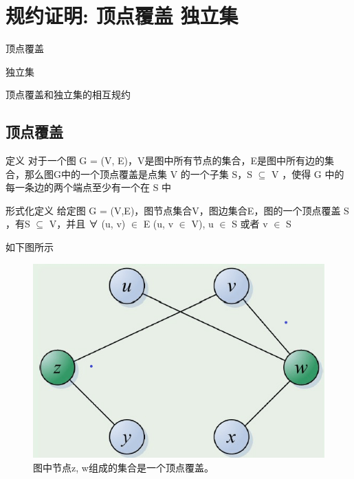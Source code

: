 \chapter{规约证明: 顶点覆盖  独立集}

\begin{introduction}
	\item 顶点覆盖
	\item 独立集
	\item 顶点覆盖和独立集的相互规约
\end{introduction}


\section{顶点覆盖}


\begin{definition}{定义}
	对于一个图 G = (V, E)，V是图中所有节点的集合，E是图中所有边的集合，那么图G中的一个顶点覆盖是点集 V 的一个子集 S，S $ \subseteq $ V ，使得 G 中的每一条边的两个端点至少有一个在 S 中
\end{definition}

\begin{definition}{形式化定义}
    给定图 G = (V,E)，图节点集合V，图边集合E，图的一个顶点覆盖 S ，有S $ \subseteq $ V，并且 ∀ (u, v) $ \in $ E (u, v $ \in $ V), u $ \in $ S 或者 v $ \in $ S
\end{definition}

\begin{example}
    如下图所示
	\begin{figure}[hbt]
        \centering
        \includegraphics[scale=0.6]{image/Proof-of-Statute1.png}
        \caption{图中节点z, w组成的集合是一个顶点覆盖。}\label{fig:example}
    \end{figure}
\end{example}

